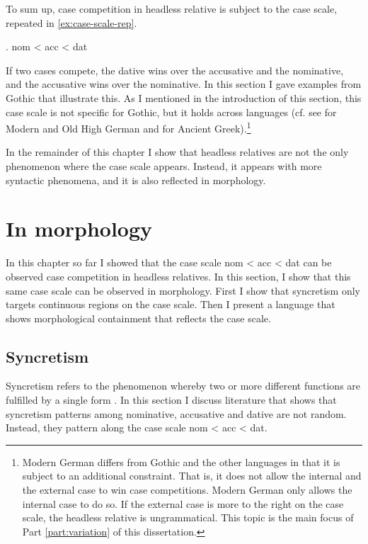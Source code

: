 To sum up, case competition in headless relative is subject to the case scale, repeated in \ref{ex:case-scale-rep}.

\ex. \ac{nom} < \ac{acc} < \ac{dat}\label{ex:case-scale-rep}

If two cases compete, the dative wins over the accusative and the nominative, and the accusative wins over the nominative. In this section I gave examples from Gothic that illustrate this. As I mentioned in the introduction of this section, this case scale is not specific for Gothic, but it holds across languages (cf. see \citealt{pittner1995} for Modern and Old High German and \citealt{grosu2003,kakarikos2014} for Ancient Greek).\footnote{
Modern German differs from Gothic and the other languages in that it is subject to an additional constraint. That is, it does not allow the internal and the external case to win case competitions. Modern German only allows the internal case to do so. If the external case is more to the right on the case scale, the headless relative is ungrammatical.
This topic is the main focus of Part \ref{part:variation} of this dissertation.}

In the remainder of this chapter I show that headless relatives are not the only phenomenon where the case scale appears. Instead, it appears with more syntactic phenomena, and it is also reflected in morphology.


\section{In morphology}\label{sec:case-morphology}

In this chapter so far I showed that the case scale \ac{nom} < \ac{acc} < \ac{dat} can be observed case competition in headless relatives.
In this section, I show that this same case scale can be observed in morphology. First I show that syncretism only targets continuous regions on the case scale. Then I present a language that shows morphological containment that reflects the case scale.


\subsection{Syncretism}

Syncretism refers to the phenomenon whereby two or more different functions are fulfilled by a single form \citep[cf.][]{baerman2002}. In this section I discuss literature that shows that syncretism patterns among nominative, accusative and dative are not random. Instead, they pattern along the case scale \ac{nom} < \ac{acc} < \ac{dat}.

